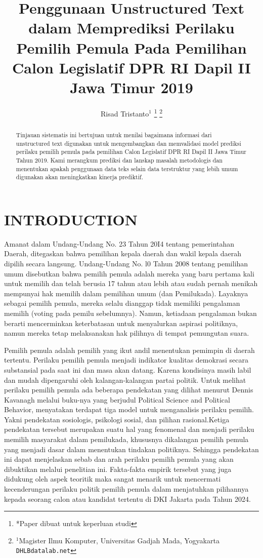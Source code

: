 \documentclass[letterpaper, 10 pt, conference]{ieeeconf}  %
\title{\LARGE \bf
Penggunaan Unstructured Text dalam Memprediksi Perilaku Pemilih Pemula Pada Pemilihan Calon Legislatif DPR RI Dapil II Jawa Timur 2019
}
\author{Risad Tristanto$^{1}$%
\thanks{*Paper dibuat untuk keperluan studi}%
\thanks{$^{1}$Magister Ilmu Komputer,
        Universitas Gadjah Mada, Yogyakarta
        {\tt\small DHLBdatalab.net}}%
}
\begin{document}
\maketitle
\thispagestyle{empty}
\pagestyle{empty}


\begin{abstract}

Tinjauan sistematis ini bertujuan untuk menilai bagaimana informasi dari unstructured text digunakan untuk mengembangkan dan memvalidasi model prediksi perilaku pemilih pemula pada pemilihan Calon Legislatif DPR RI Dapil II Jawa Timur Tahun 2019. Kami merangkum prediksi dan lanskap masalah metodologis dan menentukan apakah penggunaan data teks selain data terstruktur yang lebih umum digunakan akan meningkatkan kinerja prediktif.

\end{abstract}


\section{INTRODUCTION}

Amanat dalam Undang-Undang No. 23 Tahun 20I4 tentang pemerintahan Daerah, ditegaskan bahwa pemilihan kepala daerah dan wakil kepala daerah dipilih secara langsung. Undang-Undang No. l0 Tahun 2008 tentang pemilihan umum disebutkan bahwa pemilih pemula adalah mereka yang baru pertama kali untuk memilih dan telah berusia 17 tahun atau lebih atau sudah pernah menikah mempunyai hak memilih dalam pemilihan umum (dan Pemilukada). Layaknya sebagai pemilih pemula, mereka selalu dianggap tidak memiliki pengalaman memilih (voting pada pemilu sebelumnya). Namun, ketiadaan pengalaman bukan berarti mencerminkan keterbatasan untuk menyalurkan aspirasi politiknya, namun mereka tetap melaksanakan hak pilihnya di tempat pemungutan suara.

Pemilih pemula adalah pemilih yang ikut andil menentukan pemimpin di daerah tertentu. Perilaku pemilih pemula menjadi indikator kualitas demokrasi secara substansial pada saat ini dan masa akan datang. Karena kondisinya masih labil dan mudah dipengaruhi oleh kalangan-kalangan partai politik. Untuk melihat perilaku pemilih pemula ada beberapa pendekatan yang dilihat menurut Dennis Kavanagh melalui buku-nya yang berjudul Political Science and Political Behavior, menyatakan terdapat tiga model untuk menganalisis perilaku pemilih. Yakni pendekatan sosiologis, psikologi sosial, dan pilihan rasional.Ketiga pendekatan tersebut merupakan suatu hal yang fenomenal dan menjadi perilaku memilih masyarakat dalam pemilukada, khususnya dikalangan pemilih pemula yang menjadi dasar dalam menentukan tindakan politiknya. Sehingga pendekatan ini dapat menjelaskan sebab dan arah perilaku pemilih pemula yang akan dibuktikan melalui penelitian ini. Fakta-fakta empirik tersebut yang juga didukung oleh aspek teoritik maka sangat menarik untuk mencermati kecenderungan perilaku politik pemilih pemula dalam menjatuhkan pilihannya kepada seorang calon atau kandidat tertentu di DKI Jakarta pada Tahun 2024.
\end{document}

